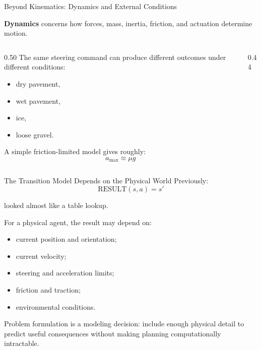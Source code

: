 \documentclass[aspectratio=169,10pt]{beamer}
\begin{document}
\begin{frame}[shrink=20]{Beyond Kinematics: Dynamics and External Conditions}
  \begin{cpdefinition}
    \textbf{Dynamics} concerns how forces, mass, inertia, friction, and actuation determine motion.
  \end{cpdefinition}

  \begin{columns}[T,onlytextwidth]
    \begin{column}{0.50\textwidth}
      The same steering command can produce different outcomes under different conditions:
      \begin{itemize}
        \item dry pavement,
        \item wet pavement,
        \item ice,
        \item loose gravel.
      \end{itemize}

      A simple friction-limited model gives roughly:
      \[
        a_{\max}\approx \mu g
      \]
    \end{column}

    \begin{column}{0.44\textwidth}
    \end{column}
  \end{columns}
\end{frame}

\begin{frame}[shrink=20]{The Transition Model Depends on the Physical World}
  Previously:
  \[
    \mathrm{RESULT}(s,a)=s'
  \]

  looked almost like a table lookup.

  For a physical agent, the result may depend on:
  \begin{itemize}
    \item current position and orientation;
    \item current velocity;
    \item steering and acceleration limits;
    \item friction and traction;
    \item environmental conditions.
  \end{itemize}

  \begin{keyidea}
    Problem formulation is a modeling decision: include enough physical detail to predict useful consequences without making planning computationally intractable.
  \end{keyidea}
\end{frame}
\end{document}
